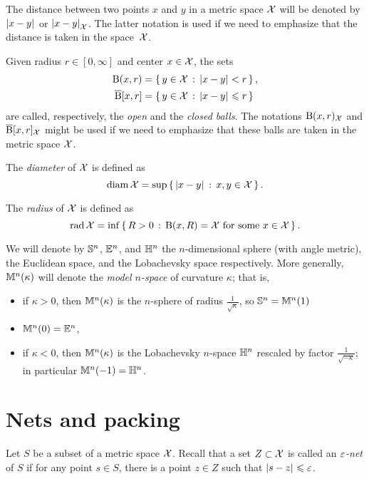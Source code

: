 The distance between two points $x$ and $y$ in a metric space $\mathcal{X}$ will be denoted by $|{x}-{y}|_{}^{{}}$ or $|{x}-{y}|_{\mathcal{X}}^{{}}$.\label{page:|x-y|X}
The latter notation is used if we need to emphasize 
that the distance is taken in the space~${\mathcal{X}}$.

Given radius $r\in[0,\infty]$ and center $x\in \mathcal{X}$, the sets
\begin{align*}
\mathrm{B}{}(x,r)&=\left\{\,{y\in \mathcal{X}}\,:\,{|{x}-{y}|_{}^{{}}<r}\,\right\},
\\
\overline{\mathrm{B}}{}[x,r]&=\left\{\,{y\in \mathcal{X}}\,:\,{|{x}-{y}|_{}^{{}}\leqslant r}\,\right\}
\end{align*}
are called, respectively, the \emph{open} and  the \emph{closed  balls}.
The notations $\mathrm{B}{}(x,r)_{\mathcal{X}}$ and $\overline{\mathrm{B}}{}[x,r]_{\mathcal{X}}$
might be used if we need to emphasize that these balls are taken in the metric space $\mathcal{X}$.

The \emph{diameter} of $\mathcal{X}$ is  defined as
\[\operatorname{\rm diam}\nolimits \mathcal{X}=\sup\left\{\,{|{x}-{y}|_{}^{{}}}\,:\,{x,y\in \mathcal{X}}\,\right\}.\]

The \emph{radius} of $\mathcal{X}$ is  defined as
\[\rad \spc{X}=\inf\set{R>0}{\oBall(x,R)= \spc{X}\ \text{for some}\ x\in\spc{X}}.\]

We will denote by $\mathbb{S}^n$, $\mathbb{E}^n$, and $\mathbb{H}^n$ the $n$-dimensional sphere (with angle metric),
the Euclidean space, and the Lobachevsky space respectively.
More generally, $\mathbb{M}^n(\kappa)$ will denote the \emph{model $n$-space} of curvature $\kappa$;
that is,
\begin{itemize}
\item if $\kappa>0$, then $\mathbb{M}^n(\kappa)$ is the $n$-sphere of radius $\tfrac{1}{\sqrt{\kappa}}$, so $\mathbb{S}^n=\mathbb{M}^n(1)$
\item $\mathbb{M}^n(0)=\mathbb{E}^n$,
\item if $\kappa<0$, then $\mathbb{M}^n(\kappa)$ is the Lobachevsky $n$-space $\mathbb{H}^n$ rescaled by factor $\tfrac{1}{\sqrt{-\kappa}}$;
in particular $\mathbb{M}^n(-1)=\mathbb{H}^n$.
\end{itemize}

\section{Nets and packing}\label{sec:packing}

Let $S$ be a subset of a metric space $\mathcal{X}$.
Recall that a set $Z\subset \mathcal{X}$ is called an \emph{$\varepsilon$-net} of $S$ if for any point $s\in S$, there is a point $z\in Z$ such that $|{s}-{z}|_{}^{{}}\leqslant\varepsilon$.

